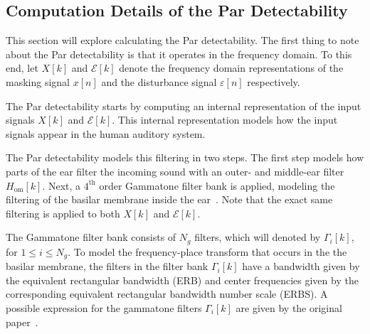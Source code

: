 \subsection{Computation Details of the Par Detectability}
\label{ch:perceptual:implementation:computation}
This section will explore calculating the Par detectability.
The first thing to note about the Par detectability is that it operates in the frequency domain. 
To this end, let $X[k]$ and $\mathcal{E}[k]$ denote the frequency domain representations of the masking signal $x[n]$ and 
the disturbance signal $\varepsilon[n]$ respectively.

The Par detectability starts by computing an internal representation of the input signals $X[k]$ and $\mathcal{E}[k]$.
This internal representation models how the input signals appear in the human auditory system.

The Par detectability models this filtering in two steps.
The first step models how parts of the ear filter the incoming sound with an outer- and middle-ear filter $H_\text{om}[k]$. 
Next, a $4^\text{th}$ order Gammatone filter bank is applied, modeling the filtering of the 
basilar membrane inside the ear~\cite{van2005perceptual}.
Note that the exact same filtering is applied to both $X[k]$ and $\mathcal{E}[k]$.

The Gammatone filter bank consists of $N_g$ filters, which will denoted by $\Gamma_i[k]$, for $1 \leq i \leq N_g$. 
To model the frequency-place transform that occurs in the the basilar membrane, 
the filters in the filter bank $\Gamma_i[k]$ have a bandwidth given by the equivalent 
rectangular bandwidth (ERB) and center frequencies given by the corresponding equivalent rectangular bandwidth number
scale (ERBS).
A possible expression for the gammatone filters $\Gamma_i[k]$ are given by the original paper~\cite{van2005perceptual}. 

